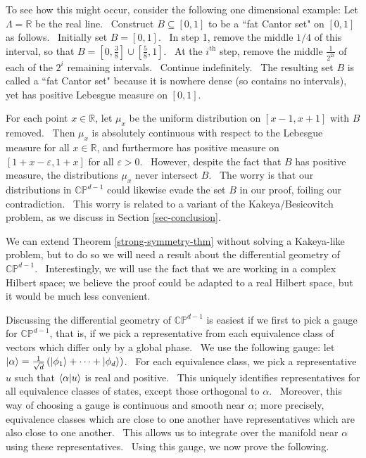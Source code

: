 \documentclass[letterpaper,11pt]{article}
\newcommand{\braket}[2]{\mbox{$ \langle #1 | #2 \rangle $}}
\newcommand{\ket}[1]{\mbox{$ | #1 \rangle $}}
\begin{document}
To see how this might occur, consider the following one dimensional example: Let $\Lambda = \mathbb{R}$ be the real line. \ Construct $B\subseteq [0,1]$ to be a ``fat Cantor set" on $[0,1]$ as follows. \ Initially set $B=[0,1]$. \ In step 1, remove the middle $1/4$ of this interval, so that $B=[0,\frac{3}{8}]\cup[\frac{5}{8},1]$. \ At the $i^{\mathrm{th}}$ step, remove the middle $\frac{1}{2^{2i}}$ of each of the $2^i$ remaining intervals. \ Continue indefinitely. \ The resulting set $B$ is called a ``fat Cantor set" because it is nowhere dense (so contains no intervals), yet has positive Lebesgue measure on $[0,1]$.


For each point $x\in \mathbb{R}$, let $\mu_x$ be the uniform distribution on $[x-1,x+1]$ with $B$ removed. \ Then $\mu_x$ is absolutely continuous with respect to the Lebesgue measure for all $x\in \mathbb{R}$, and furthermore has positive measure on $[1+x-\varepsilon, 1+x]$ for all $\varepsilon>0$. \ However, despite the fact that $B$ has positive measure, the distributions $\mu_x$ never intersect $B$. \ The worry is that our distributions in $\mathbb{CP}^{d-1}$ could likewise evade the set $B$ in our proof, foiling our contradiction. \ This worry is related to a variant of the Kakeya/Besicovitch problem, as we discuss in Section \ref{sec-conclusion}.

We can extend Theorem \ref{strong-symmetry-thm} without solving a Kakeya-like problem, but to do so we will need a result about the differential geometry of $\mathbb{CP}^{d-1}$. \ Interestingly, we will use the fact that we are working in a complex Hilbert space; we believe the proof could be adapted to a real Hilbert space, but it would be much less convenient.

Discussing the differential geometry of $\mathbb{CP}^{d-1}$ is easiest if we first to pick a gauge for $\mathbb{CP}^{d-1}$, that is, if we pick a representative from each equivalence class of vectors which differ only by a global phase. \ We use the following gauge: let $\ket{\alpha}=\frac{1}{\sqrt{d}}\left(\ket{\phi_1}+\cdots +\ket{\phi_d}\right)$. \ For each equivalence class, we pick a representative $u$ such that $\braket{\alpha}{u}$ is real and positive. \ This uniquely identifies representatives for all equivalence classes of states, except those orthogonal to $\alpha$. \ Moreover, this way of choosing a gauge is continuous and smooth near $\alpha$; more precisely, equivalence classes which are close to one another have representatives which are also close to one another. \ This allows us to integrate over the manifold near $\alpha$ using these representatives. \ Using this gauge, we now prove the following.
\end{document}
